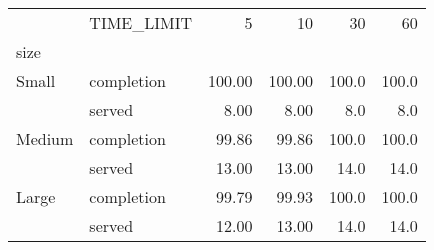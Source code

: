 \begin{tabular}{llrrrr}
\toprule
      & TIME\_LIMIT &      5  &      10 &     30 &     60 \\
size & {} &         &         &        &        \\
\midrule
Small & completion &  100.00 &  100.00 &  100.0 &  100.0 \\
      & served &    8.00 &    8.00 &    8.0 &    8.0 \\
Medium & completion &   99.86 &   99.86 &  100.0 &  100.0 \\
      & served &   13.00 &   13.00 &   14.0 &   14.0 \\
Large & completion &   99.79 &   99.93 &  100.0 &  100.0 \\
      & served &   12.00 &   13.00 &   14.0 &   14.0 \\
\bottomrule
\end{tabular}
